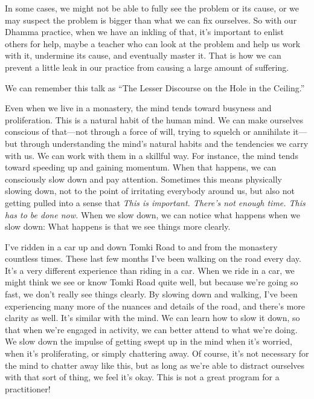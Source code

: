 In some cases, we might not be able to fully see the problem or its 
cause, or we may suspect the problem is bigger than what we can fix 
ourselves. So with our Dhamma practice, when we have an inkling of 
that, it's important to enlist others for help, maybe a teacher who can 
look at the problem and help us work with it, undermine its cause, and 
eventually master it. That is how we can prevent a little leak in our 
practice from causing a large amount of suffering.

We can remember this talk as ``The Lesser Discourse on the Hole in the 
Ceiling.''


Even when we live in a monastery, the mind tends toward busyness and 
proliferation. This is a natural habit of the human mind. We can make 
ourselves conscious of that---not through a force of will, trying to 
squelch or annihilate it---but through understanding the mind's natural 
habits and the tendencies we carry with us. We can work with them in a 
skillful way. For instance, the mind tends toward speeding up and 
gaining momentum. When that happens, we can consciously slow down and 
pay attention. Sometimes this means physically slowing down, not to the 
point of irritating everybody around us, but also not getting pulled 
into a sense that \emph{This is important. There's not enough time. 
This has to be done now.} When we slow down, we can notice what happens 
when we slow down: What happens is that we see things more clearly.

I've ridden in a car up and down Tomki Road to and from the monastery 
countless times. These last few months I've been walking on the road 
every day. It's a very different experience than riding in a car. When 
we ride in a car, we might think we see or know Tomki Road quite well, 
but because we're going so fast, we don't really see things clearly. By 
slowing down and walking, I've been experiencing many more of the 
nuances and details of the road, and there's more clarity as well. It's 
similar with the mind. We can learn how to slow it down, so that when 
we're engaged in activity, we can better attend to what we're doing. We 
slow down the impulse of getting swept up in the mind when it's 
worried, when it's proliferating, or simply chattering away. Of course, 
it's not necessary for the mind to chatter away like this, but as long 
as we're able to distract ourselves with that sort of thing, we feel 
it's okay. This is not a great program for a practitioner!

